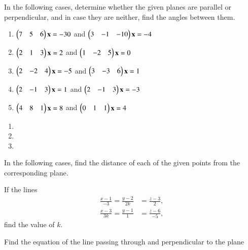\item In the following cases, determine whether the given planes are parallel or perpendicular, and in case they are neither, find the angles between them.
\begin{enumerate}
\item 
$
\begin{pmatrix}7 & 5 & 6\end{pmatrix}\mathbf{x}=-30
$
 and 
$
\begin{pmatrix}3 & -1 & -10\end{pmatrix}\mathbf{x}=-4
$
%
\item 
$
\begin{pmatrix}2 & 1 & 3\end{pmatrix}\mathbf{x}=2
$
 and 
$
\begin{pmatrix}1 & -2 & 5\end{pmatrix}\mathbf{x}=0
$
%
\item 
$
\begin{pmatrix}2 & -2 & 4\end{pmatrix}\mathbf{x}=-5
$
 and 
$
\begin{pmatrix}3 & -3 & 6\end{pmatrix}\mathbf{x}=1
$
\item 
$
\begin{pmatrix}2 & -1 & 3\end{pmatrix}\mathbf{x}=1
$
 and 
$
\begin{pmatrix}2 & -1 & 3\end{pmatrix}\mathbf{x}=-3
$
\item 
$
\begin{pmatrix}4 & 8 & 1\end{pmatrix}\mathbf{x}=8
$
 and 
$
\begin{pmatrix}0 & 1 & 1\end{pmatrix}\mathbf{x}=4
$
\end{enumerate}
\solution
\begin{enumerate}
    \item 
    
    \item 
    
    \item 
    
\end{enumerate}
\item In the following cases, find the distance of each of the given points from the corresponding plane.
\begin{table}[!h]
\centering

\caption{}
\label{table:3d}
\end{table}
%
\item 
\item 
\item If the lines 
\begin{align}
\frac{x-1}{-3} = \frac{y-2}{2k} &= \frac{z-3}{2}, 
\\
\frac{x-3}{3k} = \frac{y-1}{1} &= \frac{z-6}{-5} ,
\end{align}
find the value of $k$.
\item Find the  equation of the line passing through  and perpendicular to the plane %
